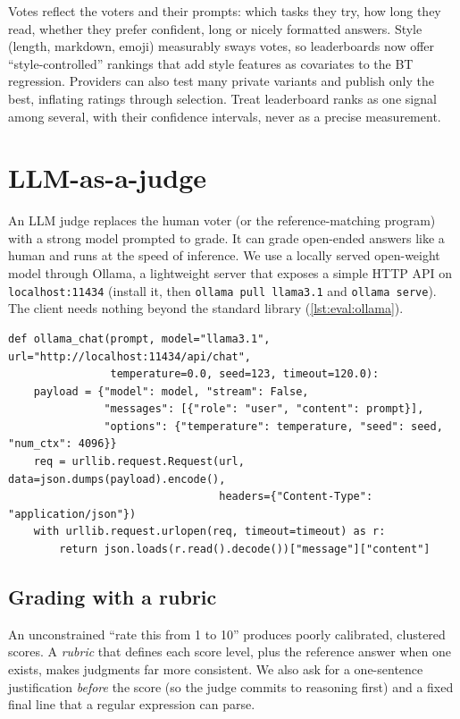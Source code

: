 \begin{deepdive}
Votes reflect the voters and their prompts: which tasks they try, how long they read, whether they
prefer confident, long or nicely formatted answers. Style (length, markdown, emoji) measurably
sways votes, so leaderboards now offer ``style-controlled'' rankings that add style features as
covariates to the BT regression. Providers can also test many private variants and publish only
the best, inflating ratings through selection. Treat leaderboard ranks as one signal among
several, with their confidence intervals, never as a precise measurement.
\end{deepdive}

\section{LLM-as-a-judge}\label{sec:eval:judge}


An LLM judge replaces the human voter (or the reference-matching program) with a strong model
prompted to grade. It can grade open-ended answers like a human and runs at the speed of
inference. We use a locally served open-weight model through Ollama, a lightweight server that
exposes a simple HTTP API on \texttt{localhost:11434} (install it, then
\texttt{ollama pull llama3.1} and \texttt{ollama serve}). The client needs nothing beyond the
standard library (\cref{lst:eval:ollama}).

\begin{lstlisting}[caption={A dependency-free Ollama chat client.},label={lst:eval:ollama}]
def ollama_chat(prompt, model="llama3.1", url="http://localhost:11434/api/chat",
                temperature=0.0, seed=123, timeout=120.0):
    payload = {"model": model, "stream": False,
               "messages": [{"role": "user", "content": prompt}],
               "options": {"temperature": temperature, "seed": seed, "num_ctx": 4096}}
    req = urllib.request.Request(url, data=json.dumps(payload).encode(),
                                 headers={"Content-Type": "application/json"})
    with urllib.request.urlopen(req, timeout=timeout) as r:
        return json.loads(r.read().decode())["message"]["content"]
\end{lstlisting}

\subsection{Grading with a rubric}
An unconstrained ``rate this from 1 to 10'' produces poorly calibrated, clustered scores. A
\emph{rubric} that defines each score level, plus the reference answer when one exists, makes
judgments far more consistent. We also ask for a one-sentence justification \emph{before} the
score (so the judge commits to reasoning first) and a fixed final line that a regular expression
can parse.

